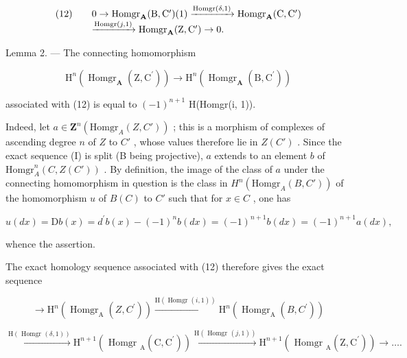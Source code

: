 \[
\begin{array}{r l}(1 2) \quad&0 \rightarrow \operatorname{Homgr} _ {\mathbf {A}} (\mathrm{B}, \mathrm{C} ^ {\prime}) (1) \xrightarrow {\operatorname{Homgr} (\delta , 1)} \operatorname{Homgr} _ {\mathbf {A}} (\mathrm{C}, \mathrm{C} ^ {\prime})\\&\xrightarrow {\operatorname{Homgr} (j , 1)} \operatorname{Homgr} _ {\mathbf {A}} (\mathrm{Z}, \mathrm{C} ^ {\prime}) \rightarrow 0.\end{array}
\]

Lemma 2. --- The connecting homomorphism

\[
\mathrm{H} ^ {n} \left(\operatorname{Homgr} _ {\mathbf {A}} \left(\mathrm{Z}, \mathrm{C} ^ {\prime}\right)\right)\rightarrow \mathrm{H} ^ {n} \left(\operatorname{Homgr} _ {\mathbf {A}} \left(\mathrm{B}, \mathrm{C} ^ {\prime}\right)\right)
\]

associated with (12) is equal to \((-1)^{n+1}\) H(Homgr(i, 1)).

Indeed, let \(a \in \mathbf{Z}^n(\text{Homgr}_A(Z, C'))\) ; this is a morphism of complexes of ascending degree \(n\) of \(Z\) to \(C'\) , whose values therefore lie in \(Z(C')\) . Since the exact sequence (I) is split (B being projective), \(a\) extends to an element \(b\) of \(\text{Homgr}_A^n(C, Z(C'))\) . By definition, the image of the class of \(a\) under the connecting homomorphism in question is the class in \(H^n(\text{Homgr}_A(B, C'))\) of the homomorphism \(u\) of \(B(C)\) to \(C'\) such that for \(x \in C\) , one has

\[
u (d x) = \mathrm{D} b (x) = d ^ {\prime} b (x) - (- 1) ^ {n} b (d x) = (- 1) ^ {n + 1} b (d x) = (- 1) ^ {n + 1} a (d x),
\]

whence the assertion.

The exact homology sequence associated with (12) therefore gives the exact sequence

\[
\rightarrow \mathrm{H} ^ {n} (\operatorname{Homgr} _ {\mathrm{A}} (Z, C ^ {\prime})) \xrightarrow {\mathrm{H} (\operatorname{Homgr} (i , 1))} \mathrm{H} ^ {n} (\operatorname{Homgr} _ {\mathrm{A}} (B, C ^ {\prime}))
\]

\[
\xrightarrow {\mathrm{H} (\text { Homgr } (\delta , 1))} \mathrm{H} ^ {n + 1} \left(\text { Homgr } _ {\mathrm{A}} \left(\mathrm{C}, \mathrm{C} ^ {\prime}\right)\right) \xrightarrow {\mathrm{H} (\text { Homgr } (j , 1))} \mathrm{H} ^ {n + 1} \left(\text { Homgr } _ {\mathrm{A}} \left(\mathrm{Z}, \mathrm{C} ^ {\prime}\right)\right)\rightarrow \dots .
\]


